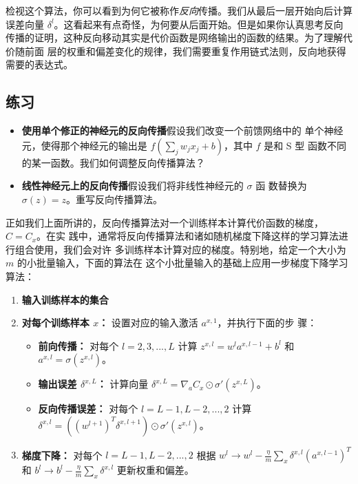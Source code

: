 检视这个算法，你可以看到为何它被称作\emph{反向}传播。我们从最后一层开始向后计算
误差向量 $\delta^l$。这看起来有点奇怪，为何要从后面开始。但是如果你认真思考反向
传播的证明，这种反向移动其实是代价函数是网络输出的函数的结果。为了理解代价随前面
层的权重和偏差变化的规律，我们需要重复作用链式法则，反向地获得需要的表达式。

\subsection*{练习}

\begin{itemize}
\item \textbf{使用单个修正的神经元的反向传播}\quad 假设我们改变一个前馈网络中的
  单个神经元，使得那个神经元的输出是 $f(\sum_j w_jx_j + b)$，其中 $f$ 是和 S 型
  函数不同的某一函数。我们如何调整反向传播算法？
\item \textbf{线性神经元上的反向传播}\quad 假设我们将非线性神经元的 $\sigma$ 函
  数替换为 $\sigma(z) = z$。重写反向传播算法。
\end{itemize}

正如我们上面所讲的，反向传播算法对一个训练样本计算代价函数的梯度，$C=C_x$。在实
践中，通常将反向传播算法和诸如随机梯度下降这样的学习算法进行组合使用，我们会对许
多训练样本计算对应的梯度。特别地，给定一个大小为 $m$ 的小批量输入，下面的算法在
这个小批量输入的基础上应用一步梯度下降学习算法：

\begin{enumerate}
\item \textbf{输入训练样本的集合}
\item \textbf{对每个训练样本 $x$：} 设置对应的输入激活 $a^{x,1}$，并执行下面的步
  骤：
  \begin{itemize}
  \item \textbf{前向传播：} 对每个 $l=2,3,...,L$ 计算 $z^{x,l} = w^la^{x,l-1} +
    b^l$ 和 $a^{x,l} = \sigma(z^{x,l})$。
  \item \textbf{输出误差 $\delta^{x,L}$：} 计算向量
    $\delta^{x,L} = \nabla_a C_x \odot \sigma'(z^{x,L})$。
  \item \textbf{反向传播误差：} 对每个 $l=L-1, L-2, ..., 2$ 计算
    $\delta^{x,l} = ((w^{l+1})^T\delta^{x,l+1})\odot \sigma'(z^{x,l})$。
  \end{itemize}
\item \textbf{梯度下降：} 对每个 $l=L-1, L-2, ..., 2$ 根据
  $w^l \rightarrow w^l - \frac{\eta}{m}\sum_x \delta^{x,l}(a^{x,l-1})^T$ 和
  $b^l \rightarrow b^l - \frac{\eta}{m}\sum_x \delta^{x,l}$ 更新权重和偏差。
\end{enumerate}

